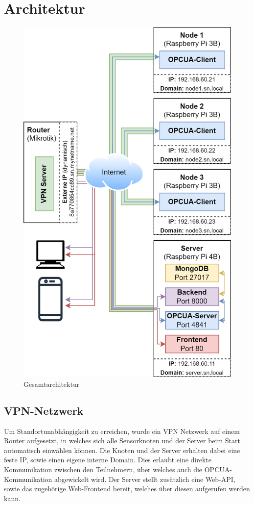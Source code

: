 \section{Architektur}
\begin{figure}[htp]
      \centering
      \includegraphics[scale=0.18]{abbildungen/Netzwerkdiagramm.png}
      \caption{Gesamtarchitektur}
      \label{arch}
\end{figure}

\subsection{VPN-Netzwerk}
Um Standortunabhängigkeit zu erreichen, wurde ein VPN Netzwerk auf einem Router aufgesetzt, in welches sich alle Sensorknoten und der Server beim Start automatisch einwählen können.
Die Knoten und der Server erhalten dabei eine feste IP, sowie einen eigene interne Domain. Dies erlaubt eine direkte Kommunikation zwischen den Teilnehmern, über welches auch die OPCUA-Kommunikation abgewickelt wird. 
Der Server stellt zusätzlich eine Web-API, sowie das zugehörige Web-Frontend bereit, welches über diesen aufgerufen werden kann. 


